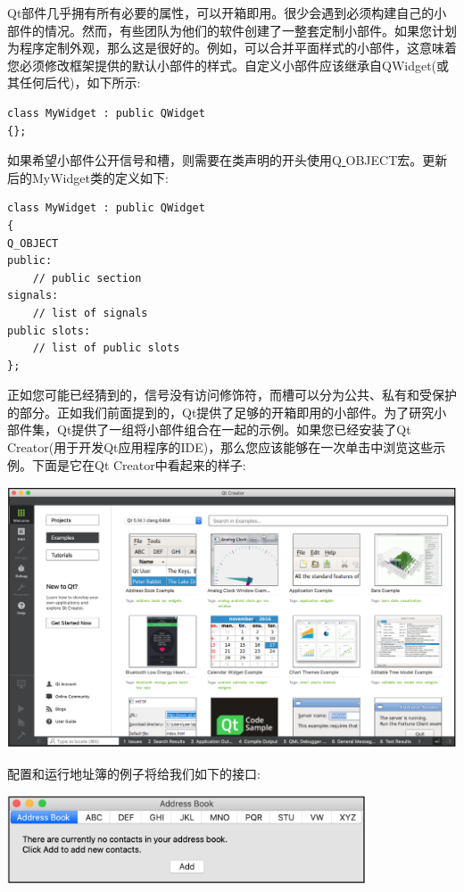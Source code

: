 Qt部件几乎拥有所有必要的属性，可以开箱即用。很少会遇到必须构建自己的小部件的情况。然而，有些团队为他们的软件创建了一整套定制小部件。如果您计划为程序定制外观，那么这是很好的。例如，可以合并平面样式的小部件，这意味着您必须修改框架提供的默认小部件的样式。自定义小部件应该继承自QWidget(或其任何后代)，如下所示: \par

\begin{lstlisting}[caption={}]
class MyWidget : public QWidget
{};
\end{lstlisting}

如果希望小部件公开信号和槽，则需要在类声明的开头使用Q\underline{ }OBJECT宏。更新后的MyWidget类的定义如下: \par

\begin{lstlisting}[caption={}]
class MyWidget : public QWidget
{
Q_OBJECT
public:
	// public section
signals:
	// list of signals
public slots:
	// list of public slots
};
\end{lstlisting}

正如您可能已经猜到的，信号没有访问修饰符，而槽可以分为公共、私有和受保护的部分。正如我们前面提到的，Qt提供了足够的开箱即用的小部件。为了研究小部件集，Qt提供了一组将小部件组合在一起的示例。如果您已经安装了Qt Creator(用于开发Qt应用程序的IDE)，那么您应该能够在一次单击中浏览这些示例。下面是它在Qt Creator中看起来的样子: \par

\begin{center}
	\includegraphics[width=1.0\textwidth]{content/Section-2/Chapter-14/12}
\end{center}

配置和运行地址簿的例子将给我们如下的接口: \par

\begin{center}
	\includegraphics[width=0.8\textwidth]{content/Section-2/Chapter-14/13}
\end{center}

